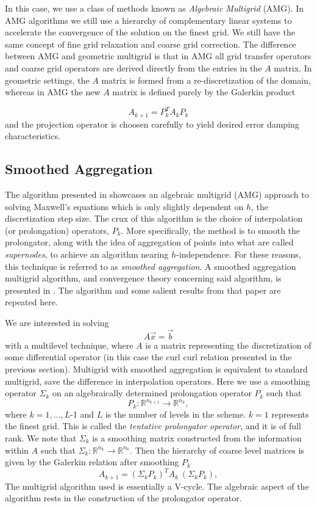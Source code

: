 \documentclass{article}
\begin{document}
In this case, we use a class of methods known as \textit{Algebraic Multigrid} (AMG).  In AMG algorithms we still use a hierarchy of complementary linear systems to accelerate the convergence of the solution on the finest grid. We still have the same concept of fine grid relaxation and coarse grid correction.  The difference between AMG and geometric multigrid is that in AMG all grid transfer operators and coarse grid operators are derived directly from the entries in the $A$ matrix.  In geometric settings, the $A$ matrix is formed from a re-discretization of the domain, whereas in AMG the new $A$ matrix is defined purely by the Galerkin product

\begin{equation}
\label{eq:11}
A_{k+1} = P_k^T A_k P_k
\end{equation}
and the projection operator is choosen carefully to yield desired error damping characteristics.


\subsection{Smoothed Aggregation} 

The algorithm presented in \cite{ Hu2006} showcases an algebraic multigrid (AMG) approach to solving Maxwell's equations which is only slightly dependent on $h$, the discretization step size. The crux of this algorithm is the choice of interpolation (or prolongation) operators, $P_k$. More specifically, the method is to smooth the prolongator, along with the idea of aggregation of points into what are called {\it supernodes}, to achieve an algorithm nearing $h$-independence. For these reasons, this technique is referred to as {\it smoothed aggregation}. A smoothed aggregation multigrid algorithm, and convergence theory concerning said algorithm, is presented in \cite{Brezina2000}. The algorithm and some salient results from that paper are repeated here. 

We are interested in solving
\[
A{\vec x} = {\vec b}
\]
\noindent with a multilevel technique, where $A$ is a matrix representing the discretization of some differential operator (in this case the curl curl relation presented in the previous section). Multigrid with smoothed aggregation is equivalent to standard multigrid, save the difference in interpolation operators. Here we use a smoothing operator $\Sigma_{k}$ on an algebraically determined prolongation operator $P_{k}$ such that
\[
P_{k}:\mathbb{R}^{n_{k+1}}\rightarrow\mathbb{R}^{n_{k}},
\]
\noindent where $k=1,...,L$-1 and $L$ is the number of levels in the scheme. $k=1$ represents the finest grid. This is called the {\it tentative prolongator operator}, and it is of full rank. We note that $\Sigma_{k}$ is a smoothing matrix constructed from the information within $A$ such that $\Sigma_{k}:\mathbb{R}^{n_{k}}\rightarrow\mathbb{R}^{n_{k}}$. Then the hierarchy of coarse level matrices is given by the Galerkin relation after smoothing $P_k$
\[
A_{k+1} = \left(\Sigma_{k}P_{k}\right)^{T}A_k~ (\Sigma_{k}P_{k}),
\]
\noindent The multigrid algorithm used is essentially a V-cycle. The algebraic aspect of the algorithm rests in the construction of the prolongator operator. 
\end{document}
